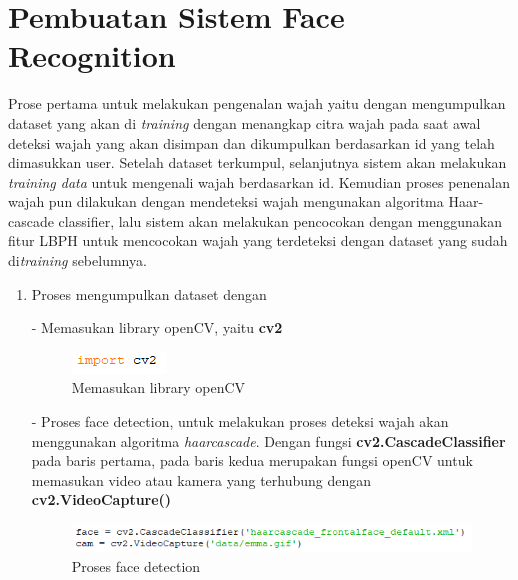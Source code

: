 \newpage
\section{Pembuatan Sistem Face Recognition}
Prose pertama untuk melakukan pengenalan wajah yaitu dengan mengumpulkan dataset yang akan di \emph{training} dengan menangkap citra wajah pada saat awal deteksi wajah yang akan 
disimpan dan dikumpulkan berdasarkan id yang telah dimasukkan user. Setelah dataset terkumpul, selanjutnya sistem akan melakukan \emph{training data} untuk mengenali wajah berdasarkan id. 
Kemudian proses penenalan wajah pun dilakukan dengan mendeteksi wajah mengunakan algoritma Haar-cascade classifier, lalu sistem akan melakukan pencocokan dengan menggunakan fitur LBPH 
untuk mencocokan wajah yang terdeteksi dengan dataset yang sudah di\emph{training} sebelumnya.
\begin{enumerate}[1.]
\item Proses mengumpulkan dataset dengan

- Memasukan library openCV, yaitu \textbf{cv2}
\begin{figure}[h!]
    \centering
    \includegraphics[width=0.3\linewidth]{images/fr_1.PNG}
    \caption{Memasukan library openCV}
\end{figure}

-  Proses face detection, untuk melakukan proses deteksi wajah akan menggunakan algoritma \emph{haarcascade}. Dengan fungsi \textbf{cv2.CascadeClassifier} pada baris pertama, 
pada baris kedua merupakan fungsi openCV untuk memasukan video atau kamera yang terhubung dengan \textbf{cv2.VideoCapture()}
\begin{figure}[h!]
    \centering
    \includegraphics[width=0.85\linewidth]{images/fr_2.PNG}
    \caption{Proses face detection}
\end{figure}


\end{enumerate}
